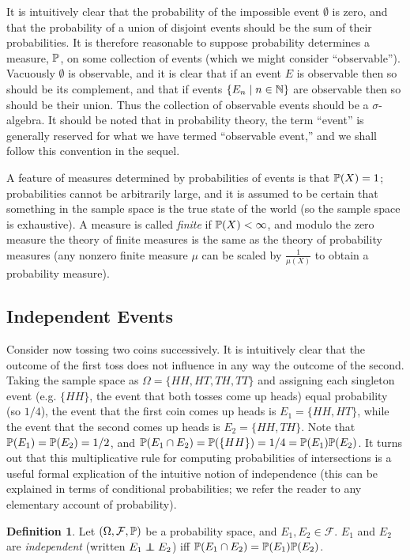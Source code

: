 \documentclass[leqno]{article}
\theoremstyle{definition}
\newtheorem{definition}[theorem]{Definition}
\newcommand{\bldset}[2]{\{{#1}\mid{#2}\}}
\newcommand\indep{\protect\mathpalette{\protect\independenT}{\perp}}
\def\independenT#1#2{\mathrel{\rlap{$#1#2$}\mkern2mu{#1#2}}}
\begin{document}
It is intuitively clear that the probability of the impossible event $\emptyset$ is zero, and that the probability of a union of disjoint events should be the sum of their probabilities. It is therefore reasonable to suppose probability determines a measure, $\P$, on some collection of events (which we might consider ``observable''). Vacuously $\emptyset$ is observable, and it is clear that if an event $E$ is observable then so should be its complement, and that if events $\bldset{E_n}{n \in \N}$ are observable then so should be their union. Thus the collection of observable events should be a $\sigma$-algebra. It should be noted that in probability theory, the term ``event'' is generally reserved for what we have termed ``observable event,'' and we shall follow this convention in the sequel.

A feature of measures determined by probabilities of events is that $\P(X) = 1$; probabilities cannot be arbitrarily large, and it is assumed to be certain that something in the sample space is the true state of the world (so the sample space is exhaustive). A measure is called {\em finite} if $\P(X) < \infty$, and modulo the zero measure the theory of finite measures is the same as the theory of probability measures (any nonzero finite measure $\mu$ can be scaled by $\frac{1}{\mu(X)}$ to obtain a probability measure).

\subsection{Independent Events}

Consider now tossing two coins successively. It is intuitively clear that the outcome of the first toss does not influence in any way the outcome of the second. Taking the sample space as $\Omega = \{HH, HT, TH, TT\}$ and assigning each singleton event (e.g. $\{HH\}$, the event that both tosses come up heads) equal probability (so $1/4$), the event that the first coin comes up heads is $E_1 = \{HH, HT\}$, while the event that the second comes up heads is $E_2 = \{HH, TH\}$. Note that $\P(E_1) = \P(E_2) = 1/2$, and $\P(E_1 \cap E_2) = \P(\{HH\}) = 1/4 = \P(E_1) \P(E_2)$. It turns out that this multiplicative rule for computing probabilities of intersections is a useful formal explication of the intuitive notion of independence (this can be explained in terms of conditional probabilities; we refer the reader to any elementary account of probability).

\begin{definition}
Let $(\Omega, \mathcal F, \P)$ be a probability space, and $E_1, E_2 \in \mathcal F$. $E_1$ and $E_2$ are {\em independent} (written $E_1 \indep E_2$) iff $\P(E_1 \cap E_2) = \P(E_1) \P(E_2)$.
\end{definition}
\end{document}
